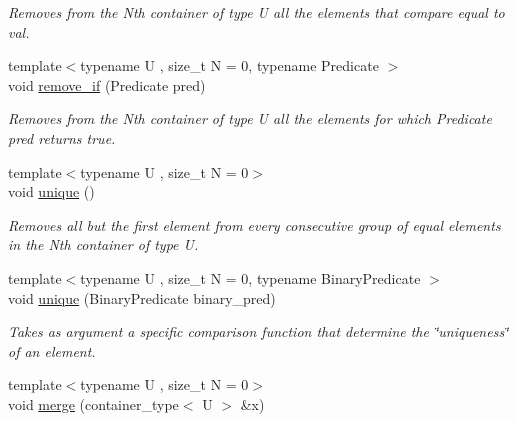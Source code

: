 \begin{DoxyCompactItemize}
\begin{DoxyCompactList}\small\item\em Removes from the Nth container of type U all the elements that compare equal to val. \end{DoxyCompactList}\item 
\hypertarget{classheterogeneous_1_1heteroforward__list_3_01_t_00_01_types_8_8_8_4_a731c5224e1d56972ff7da832cc11dcb8}{}{\footnotesize template$<$typename U , size\+\_\+t N = 0, typename Predicate $>$ }\\void \hyperlink{classheterogeneous_1_1heteroforward__list_3_01_t_00_01_types_8_8_8_4_a731c5224e1d56972ff7da832cc11dcb8}{remove\+\_\+if} (Predicate pred)\label{classheterogeneous_1_1heteroforward__list_3_01_t_00_01_types_8_8_8_4_a731c5224e1d56972ff7da832cc11dcb8}

\begin{DoxyCompactList}\small\item\em Removes from the Nth container of type U all the elements for which Predicate pred returns true. \end{DoxyCompactList}\item 
\hypertarget{classheterogeneous_1_1heteroforward__list_3_01_t_00_01_types_8_8_8_4_a780aa70b56eb58f4ecd17450718da969}{}{\footnotesize template$<$typename U , size\+\_\+t N = 0$>$ }\\void \hyperlink{classheterogeneous_1_1heteroforward__list_3_01_t_00_01_types_8_8_8_4_a780aa70b56eb58f4ecd17450718da969}{unique} ()\label{classheterogeneous_1_1heteroforward__list_3_01_t_00_01_types_8_8_8_4_a780aa70b56eb58f4ecd17450718da969}

\begin{DoxyCompactList}\small\item\em Removes all but the first element from every consecutive group of equal elements in the Nth container of type U. \end{DoxyCompactList}\item 
{\footnotesize template$<$typename U , size\+\_\+t N = 0, typename Binary\+Predicate $>$ }\\void \hyperlink{classheterogeneous_1_1heteroforward__list_3_01_t_00_01_types_8_8_8_4_ab55cd9bef7409f40f3b33a193351fb5d}{unique} (Binary\+Predicate binary\+\_\+pred)
\begin{DoxyCompactList}\small\item\em Takes as argument a specific comparison function that determine the \char`\"{}uniqueness\char`\"{} of an element. \end{DoxyCompactList}\item 
\hypertarget{classheterogeneous_1_1heteroforward__list_3_01_t_00_01_types_8_8_8_4_abb8e12fd7d01f9a5cecc2f093249cc9e}{}{\footnotesize template$<$typename U , size\+\_\+t N = 0$>$ }\\void \hyperlink{classheterogeneous_1_1heteroforward__list_3_01_t_00_01_types_8_8_8_4_abb8e12fd7d01f9a5cecc2f093249cc9e}{merge} (container\+\_\+type$<$ U $>$ \&x)\label{classheterogeneous_1_1heteroforward__list_3_01_t_00_01_types_8_8_8_4_abb8e12fd7d01f9a5cecc2f093249cc9e}


\end{DoxyCompactItemize}
